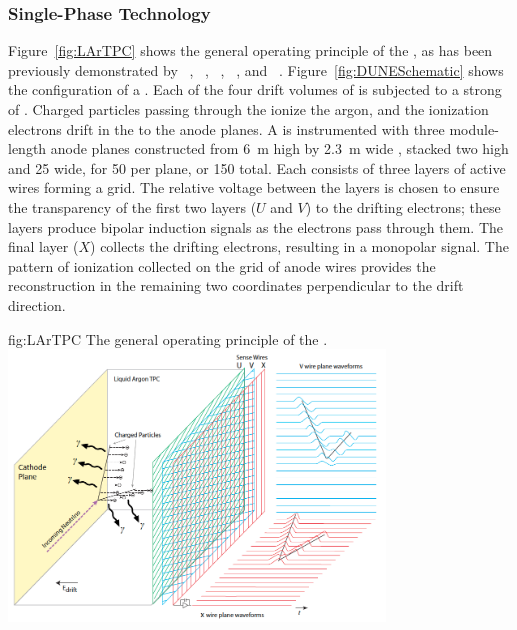 \subsubsection{Single-Phase Technology}
\label{sec:fdsp-exec-splar}

Figure~\ref{fig:LArTPC} shows the general operating principle of the  , as has been previously demonstrated by  ~\cite{Icarus-T600}, ~\cite{microboone}, ~\cite{Anderson:2012vc}, ~\cite{Cavanna:2014iqa}, and ~\cite{Abi:2017aow}. Figure~\ref{fig:DUNESchematic} shows the configuration of a  . Each of the four drift volumes of  is subjected to a strong \efield of \spmaxfield. Charged particles passing through the  ionize the argon, and the ionization electrons drift in the \efield to the anode planes. A  is instrumented with three module-length anode planes constructed from \SI{6}{m} high by \SI{2.3}{m} wide , stacked two high and 25 wide, for 50  per plane, or 150 total.  Each  consists of three layers of active wires forming a grid. The relative voltage between the layers is chosen to ensure the transparency of the first two layers ($U$ and $V$) to the drifting electrons; these layers produce bipolar induction signals as the electrons pass through them. The final layer ($X$) collects the drifting electrons, resulting in a monopolar signal. The pattern of ionization collected on the grid of anode wires provides the reconstruction in the remaining two coordinates perpendicular to the drift direction.

\begin{dunefigure}{fig:LArTPC}
{The general operating principle of the  .}
\includegraphics[width=0.75\textwidth]{graphics/TheBoPicture.png} 
\end{dunefigure}


